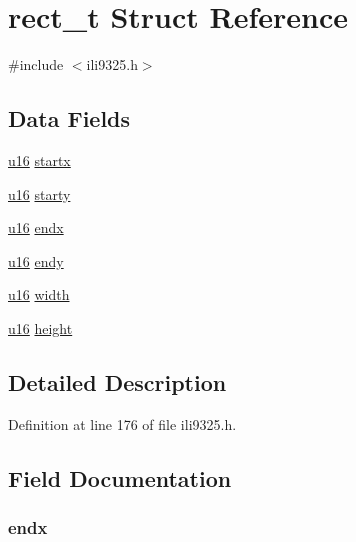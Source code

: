\hypertarget{structrect__t}{\section{rect\-\_\-t Struct Reference}
\label{structrect__t}
}


{\ttfamily \#include $<$ili9325.\-h$>$}

\subsection*{Data Fields}
\begin{DoxyCompactItemize}
\item 
\hyperlink{p8_2pinguino_2core_2typedef_8h_a50b0d1c7a54fa09a64a3ac111c778520}{u16} \hyperlink{structrect__t_af3a2de9f6c223308dc8c2e6598f8a57c}{startx}
\item 
\hyperlink{p8_2pinguino_2core_2typedef_8h_a50b0d1c7a54fa09a64a3ac111c778520}{u16} \hyperlink{structrect__t_af8514b92748148324f80b9df3f2d1366}{starty}
\item 
\hyperlink{p8_2pinguino_2core_2typedef_8h_a50b0d1c7a54fa09a64a3ac111c778520}{u16} \hyperlink{structrect__t_aa48474b9abb7bea00980449041dc7c9d}{endx}
\item 
\hyperlink{p8_2pinguino_2core_2typedef_8h_a50b0d1c7a54fa09a64a3ac111c778520}{u16} \hyperlink{structrect__t_aba63ecb5e6ab30685ab49c247da6f11b}{endy}
\item 
\hyperlink{p8_2pinguino_2core_2typedef_8h_a50b0d1c7a54fa09a64a3ac111c778520}{u16} \hyperlink{structrect__t_a5103232dda61eefd81b5b849643c5753}{width}
\item 
\hyperlink{p8_2pinguino_2core_2typedef_8h_a50b0d1c7a54fa09a64a3ac111c778520}{u16} \hyperlink{structrect__t_a46a3d4708b9b955a65540f1c7f9d47b5}{height}
\end{DoxyCompactItemize}


\subsection{Detailed Description}


Definition at line 176 of file ili9325.\-h.



\subsection{Field Documentation}
\hypertarget{structrect__t_aa48474b9abb7bea00980449041dc7c9d}{
\subsubsection[{endx}]{ endx}}\label{structrect__t_aa48474b9abb7bea00980449041dc7c9d}


